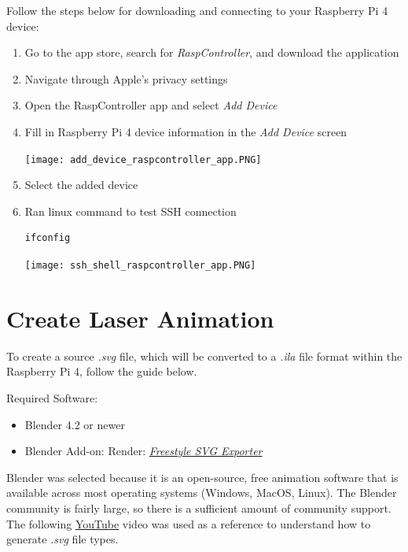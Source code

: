 \documentclass[journal]{IEEEtran}
\begin{document}
    Follow the steps below for downloading and connecting to your Raspberry Pi 4 device:
    \begin{enumerate}
        \item Go to the app store, search for \emph{RaspController}, and download the application
        
        \item Navigate through Apple's privacy settings
        
        \item Open the RaspController app and select \emph{Add Device} 
        
        \item Fill in Raspberry Pi 4 device information in the \emph{Add Device} screen
        
        \texttt{[image: add\_device\_raspcontroller\_app.PNG]}
        
        \item Select the added device
        
        \item Ran linux command to test SSH connection
        
        \begin{lstlisting}[frame=single, basicstyle=\ttfamily\footnotesize, breaklines=true]
            ifconfig
        \end{lstlisting}

        \texttt{[image: ssh\_shell\_raspcontroller\_app.PNG]}
    \end{enumerate}

    \section{Create Laser Animation}
    To create a source \emph{.svg} file, which will be converted to a \emph{.ila} file format within the Raspberry Pi 4, follow the guide below.

    Required Software:
    \begin{itemize}
        \item Blender 4.2 or newer
        \item Blender Add-on: Render: {\href{https://extensions.blender.org/add-ons/freestyle-svg-exporter/}{\emph{Freestyle SVG Exporter}}}
    \end{itemize} 

    Blender was selected because it is an open-source, free animation software that is available across most operating systems (Windows, MacOS, Linux).
    The Blender community is fairly large, so there is a sufficient amount of community support.
    The following {\href{https://youtu.be/PrlK5Y74sR8?si=fridcX0fLfz2cV0W}{YouTube}} video was used as a reference to understand how to generate \emph{.svg} file types. 
\end{document}
